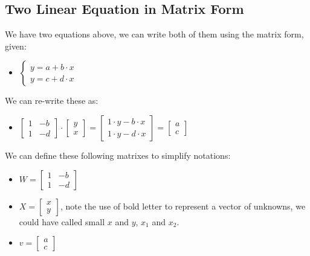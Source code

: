\documentclass[
]{book}
\providecommand{\tightlist}{%
  \setlength{\itemsep}{0pt}\setlength{\parskip}{0pt}}
\begin{document}
\hypertarget{two-linear-equation-in-matrix-form}{%
\subsection{Two Linear Equation in Matrix Form}\label{two-linear-equation-in-matrix-form}}

We have two equations above, we can write both of them using the matrix
form, given:

\begin{itemize}
\tightlist
\item
  \(\displaystyle \left\lbrace \begin{array}{c} y=a+b\cdot x\\ y=c+d\cdot x \end{array}\right.\)
\end{itemize}

We can re-write these as:

\begin{itemize}
\tightlist
\item
  \(\displaystyle \left\lbrack \begin{array}{cc} 1 & -b\\ 1 & -d \end{array}\right\rbrack \cdot \left\lbrack \begin{array}{c} y\\ x \end{array}\right\rbrack =\left\lbrack \begin{array}{cc} 1\cdot y-b\cdot x\\ 1\cdot y-d\cdot x \end{array}\right\rbrack =\left\lbrack \begin{array}{c} a\\ c \end{array}\right\rbrack\)
\end{itemize}

We can define these following matrixes to simplify notations:

\begin{itemize}
\item
  \(\displaystyle W=\left\lbrack \begin{array}{cc} 1 & -b\\ 1 & -d \end{array}\right\rbrack\)
\item
  \({X}=\left\lbrack \begin{array}{c} x\\ y \end{array}\right\rbrack\), note the use of bold letter to represent
  a vector of unknowns, we could have called small \(x\) and \(y\), \(x_1\)
  and \(x_2\).
\item
  \(\displaystyle v=\left\lbrack \begin{array}{c} a\\ c \end{array}\right\rbrack\)
\end{itemize}
\end{document}
